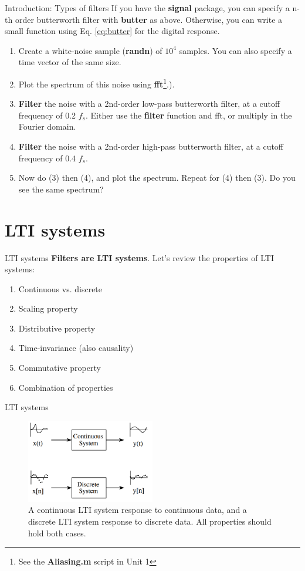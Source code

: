 \documentclass{beamer}
\begin{document}
\begin{frame}[fragile]{Introduction: Types of filters}
\small
If you have the \textbf{signal} package, you can specify a n-th order butterworth filter with \textbf{butter} as above.  Otherwise, you can write a small function using Eq. \ref{eq:butter} for the digital response.
\begin{enumerate}
\item Create a white-noise sample (\textbf{randn}) of $10^4$ samples.  You can also specify a time vector of the same size.
\item Plot the spectrum of this noise using \textbf{fft}\footnote{See the \textbf{Aliasing.m} script in Unit 1}.).
\item \textbf{\alert{Filter}} the noise with a 2nd-order low-pass butterworth filter, at a cutoff frequency of 0.2 $f_s$. Either use the \textbf{filter} function and fft, or multiply in the Fourier domain.
\item \textbf{\alert{Filter}} the noise with a 2nd-order high-pass butterworth filter, at a cutoff frequency of 0.4 $f_s$.
\item Now do (3) then (4), and plot the spectrum.  Repeat for (4) then (3).  Do you see the same spectrum?
\end{enumerate}
\end{frame}

\section{LTI systems}

\begin{frame}[fragile]{LTI systems}
\textbf{Filters are LTI systems}.  Let's review the properties of LTI systems:
\begin{enumerate}
\item Continuous vs. discrete
\item Scaling property
\item Distributive property
\item Time-invariance (also causality)
\item Commutative property
\item Combination of properties
\end{enumerate}
\end{frame}

\begin{frame}{LTI systems}
\begin{figure}
\centering
\includegraphics[width=0.5\textwidth]{figures/LTI2.png}
\caption{\label{fig:LTI2} A continuous LTI system response to continuous data, and a discrete LTI system response to discrete data.  All properties should hold both cases.}
\end{figure}
\end{frame}
\end{document}
